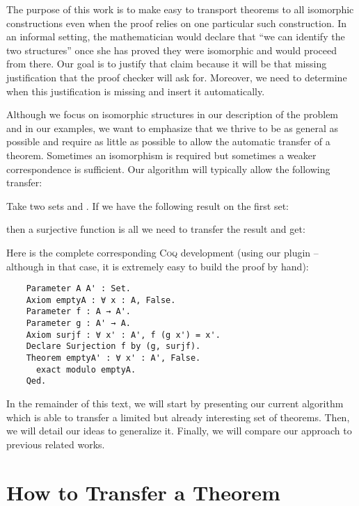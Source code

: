 \documentclass{llncs}
\begin{document}
The purpose of this work is to make easy to transport theorems
to all isomorphic constructions even when the proof relies on one
particular such construction. In an informal setting,
the mathematician would declare that ``we can identify the two structures''
once she has proved they were isomorphic and would proceed from there.
Our goal is to justify that claim because it will be that missing
justification that the proof checker will ask for.
Moreover, we need to determine when this justification is missing and
insert it automatically.

Although we focus on isomorphic structures in our description of the
problem and in our examples, we want to emphasize that we thrive to be
as general as possible and require as little as possible to allow
the automatic transfer of a theorem. Sometimes an isomorphism is required
but sometimes a weaker correspondence is sufficient.
Our algorithm will typically allow the following
transfer:

\begin{example}
    Take two sets  and .
    If we have the following result on the first set:
    \begin{axiom}[A is empty]
        
    \end{axiom}
    then a surjective function  is all we need to
    transfer the result and get:
    \begin{theorem}[A' is empty]
        
    \end{theorem}

    Here is the complete corresponding \textsc{Coq} development
    (using our plugin -- although in that case, it is extremely easy to
    build the proof by hand):
    \begin{verbatim}
    Parameter A A' : Set.
    Axiom emptyA : ∀ x : A, False.
    Parameter f : A → A'.
    Parameter g : A' → A.
    Axiom surjf : ∀ x' : A', f (g x') = x'.
    Declare Surjection f by (g, surjf).
    Theorem emptyA' : ∀ x' : A', False.
      exact modulo emptyA.
    Qed.\end{verbatim}
\end{example}

In the remainder of this text, we will start by presenting our current
algorithm which is able to transfer a limited but already interesting
set of theorems. Then, we will detail our ideas to generalize it.
Finally, we will compare our approach to previous related works.

\section{How to Transfer a Theorem}
\label{sec:transf}
\end{document}
